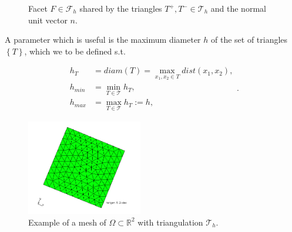 \begin{figure}[!h]
\centering
{}
\caption{Facet $F \in \mathcal{F}_h $ shared by the triangles $T^{+}, T^{-} \in \mathcal{T}_{h} $ and the normal unit vector $n$.  }
    \label{fig:normal}
\end{figure}

A parameter which is useful is the maximum diameter $h$ of the set of triangles $\left\{ T \right\} $, which we to be defined s.t.

\begin{equation}
\begin{split}
    h _{T} & = diam\left( T \right)   = \max_{x_1, x_{2} \in T} dist(x_{1}, x_{2}),  \\
    h_{min} & = \min_{T \in \mathcal{T} } h_{T}, \\
    h_{max} &= \max_{T \in \mathcal{T} }  h_{T} := h,
\end{split}
.\end{equation}

\begin{figure}[!h]
    \centering
    \includegraphics[width=0.45\textwidth]{figures/mesh.jpg}
    \caption{Example of a mesh of $\Omega \subset \mathbb{R} ^{2}$ with triangulation $\mathcal{T} _{h}$.    }
    \label{fig:mesh_example}
\end{figure}

